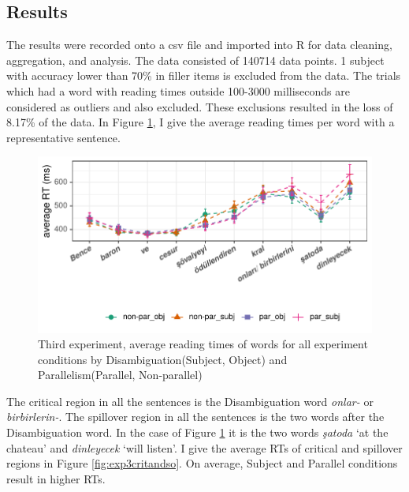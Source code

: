 \subsection{Results}

The results were recorded onto a csv file and imported into R \citep{team2013r} for data cleaning, aggregation, and analysis. The data consisted of 140714 data points. 1 subject with accuracy lower than 70\% in filler items is excluded from the data. The trials which had a word with reading times outside 100-3000 milliseconds are considered as outliers and also excluded. These exclusions resulted in the loss of 8.17\% of the data. In Figure \ref{fig:exp3sentenceread}, I give the average reading times per word with a representative sentence.


\begin{knitrout}
\color{fgcolor}\begin{figure}[hbt!]

{\centering \includegraphics[]{experiments/equivalance/report/figure/exp3sentenceread-1.pdf} 

}

\caption[Third experiment, average reading times of words for all experiment conditions by Disambiguation(Subject, Object) and Parallelism(Parallel, Non-parallel)]{Third experiment, average reading times of words for all experiment conditions by Disambiguation(Subject, Object) and Parallelism(Parallel, Non-parallel)}\label{fig:exp3sentenceread}
\end{figure}


\end{knitrout}

The critical region in all the sentences is the Disambiguation word \textit{onlar-{\Case}} or \textit{birbirlerin-{\Case}}. The spillover region in all the sentences is the two words after the Disambiguation word. In the case of Figure \ref{fig:exp3sentenceread} it is the two words \textit{şatoda} `at the chateau' and \textit{dinleyecek} `will listen'. I give the average RTs of critical and spillover regions in Figure \ref{fig:exp3critandso}. On average, Subject and Parallel conditions result in higher RTs.

